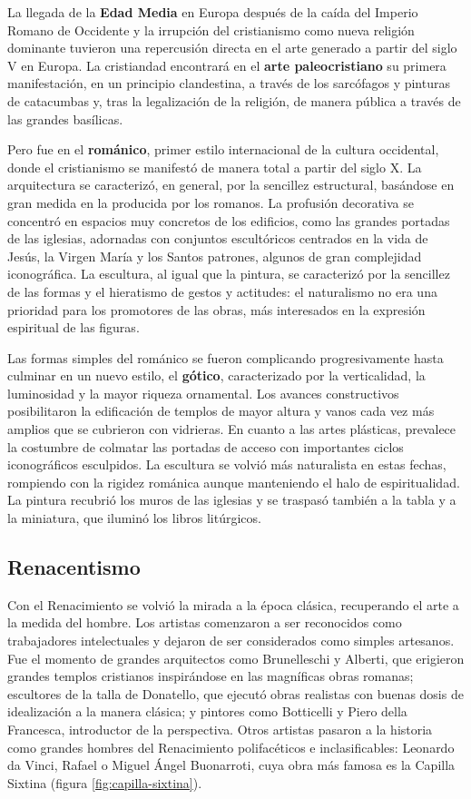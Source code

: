 La llegada de la \textbf{Edad Media} en Europa después de la caída del Imperio Romano de Occidente y la irrupción del cristianismo como nueva religión dominante tuvieron una repercusión directa en el arte generado a partir del siglo V en Europa. La cristiandad encontrará en el \textbf{arte paleocristiano} su primera manifestación, en un principio clandestina, a través de los sarcófagos y pinturas de catacumbas y, tras la legalización de la religión, de manera pública a través de las grandes basílicas. 

Pero fue en el \textbf{románico}, primer estilo internacional de la cultura occidental, donde el cristianismo se manifestó de manera total a partir del siglo X. La arquitectura se caracterizó, en general, por la sencillez estructural, basándose en gran medida en la producida por los romanos. La profusión decorativa se concentró en espacios muy concretos de los edificios, como las grandes portadas de las iglesias, adornadas con conjuntos escultóricos centrados en la vida de Jesús, la Virgen María y los Santos patrones, algunos de gran complejidad iconográfica. La escultura, al igual que la pintura, se caracterizó por la sencillez de las formas y el hieratismo de gestos y actitudes: el naturalismo no era una prioridad para los promotores de las obras, más interesados en la expresión espiritual de las figuras.

Las formas simples del románico se fueron complicando progresivamente hasta culminar en un nuevo estilo, el \textbf{gótico}, caracterizado por la verticalidad, la luminosidad y la mayor riqueza ornamental. Los avances constructivos posibilitaron la edificación de templos de mayor altura y vanos cada vez más amplios que se cubrieron con vidrieras. En cuanto a las artes plásticas, prevalece la costumbre de colmatar las portadas de acceso con importantes ciclos iconográficos esculpidos. La escultura se volvió más naturalista en estas fechas, rompiendo con la rigidez románica aunque manteniendo el halo de espiritualidad. La pintura recubrió los muros de las iglesias y se traspasó también a la tabla y a la miniatura, que iluminó los libros litúrgicos.

\subsection{Renacentismo}

Con el Renacimiento se volvió la mirada a la época clásica, recuperando el arte a la medida del hombre. Los artistas comenzaron a ser reconocidos como trabajadores intelectuales y dejaron de ser considerados como simples artesanos. Fue el momento de grandes arquitectos como Brunelleschi y Alberti, que erigieron grandes templos cristianos inspirándose en las magníficas obras romanas; escultores de la talla de Donatello, que ejecutó obras realistas con buenas dosis de idealización a la manera clásica; y pintores como Botticelli y Piero della Francesca, introductor de la perspectiva. Otros artistas pasaron a la historia como grandes hombres del Renacimiento polifacéticos e inclasificables: Leonardo da Vinci, Rafael o Miguel Ángel Buonarroti, cuya obra más famosa es la Capilla Sixtina (figura \ref{fig:capilla-sixtina}). 

